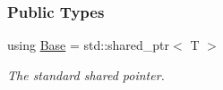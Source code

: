 \subsubsection*{Public Types}
\begin{DoxyCompactItemize}
\item 
using \hyperlink{classslb_1_1core_1_1util_1_1deref__shared__ptr_a288bb6317a3a5b58f0d1af011ec323f0}{Base} = std\+::shared\+\_\+ptr$<$ T $>$\hypertarget{classslb_1_1core_1_1util_1_1deref__shared__ptr_a288bb6317a3a5b58f0d1af011ec323f0}{}\label{classslb_1_1core_1_1util_1_1deref__shared__ptr_a288bb6317a3a5b58f0d1af011ec323f0}

\begin{DoxyCompactList}\small\item\em The standard shared pointer. \end{DoxyCompactList}\end{DoxyCompactItemize}
